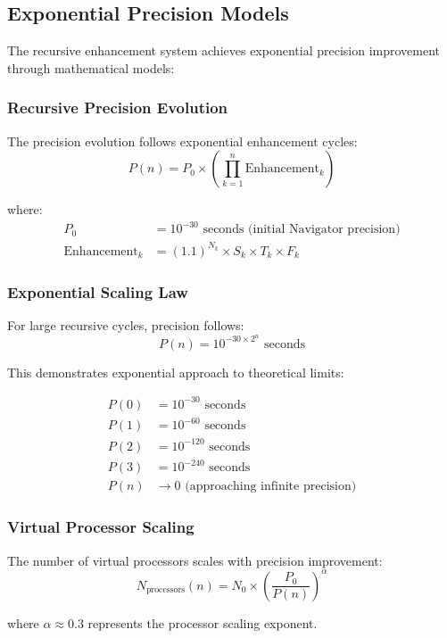 \documentclass[12pt,a4paper]{article}
\begin{document}
{\subsection{Exponential Precision Models}

The recursive enhancement system achieves exponential precision improvement through mathematical models:

\subsubsection{Recursive Precision Evolution}

The precision evolution follows exponential enhancement cycles:
$$P(n) = P_0 \times \left(\prod_{k=1}^{n} \text{Enhancement}_k\right)$$

where:
\begin{align}
P_0 &= 10^{-30} \text{ seconds (initial Navigator precision)} \\
\text{Enhancement}_k &= (1.1)^{N_k} \times S_k \times T_k \times F_k
\end{align}

\subsubsection{Exponential Scaling Law}

For large recursive cycles, precision follows:
$$P(n) = 10^{-30 \times 2^n} \text{ seconds}$$

This demonstrates exponential approach to theoretical limits:

\begin{align}
P(0) &= 10^{-30} \text{ seconds} \\
P(1) &= 10^{-60} \text{ seconds} \\
P(2) &= 10^{-120} \text{ seconds} \\
P(3) &= 10^{-240} \text{ seconds} \\
P(n) &\rightarrow 0 \text{ (approaching infinite precision)}
\end{align}

\subsubsection{Virtual Processor Scaling}

The number of virtual processors scales with precision improvement:
$$N_{\text{processors}}(n) = N_0 \times \left(\frac{P_0}{P(n)}\right)^{\alpha}$$

where $\alpha \approx 0.3$ represents the processor scaling exponent.

}
\end{document}
